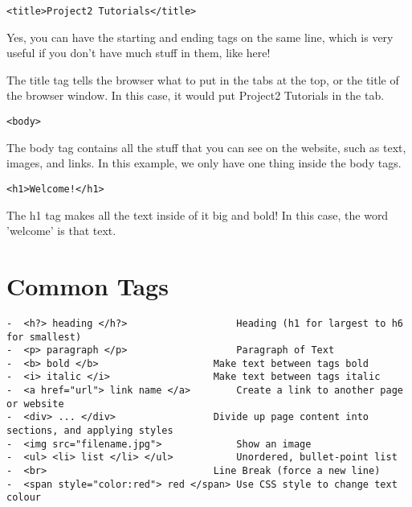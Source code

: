 \documentclass[11pt]{article}
\begin{document}
\begin{verbatim}
<title>Project2 Tutorials</title>
\end{verbatim}

Yes, you can have the starting and ending tags on the same line, which is very useful if you don't have much stuff in them, like here!

The title tag tells the browser what to put in the tabs at the top, or the title of the browser window. In this case, it would put Project2 Tutorials in the tab.

\begin{verbatim}
<body>
\end{verbatim}

The body 
tag contains all the stuff that you can see on the website, such as text, images, and links. In this example, we only have one thing inside the body tags.

\begin{verbatim}
<h1>Welcome!</h1>
\end{verbatim}

The h1 tag makes all the text inside of it big and bold! In this case, the word 'welcome' is that text.

\section*{Common Tags}
\label{sec:orge685565}
\begin{verbatim}
-  <h?> heading </h?>	                Heading (h1 for largest to h6 for smallest)
-  <p> paragraph </p>	                Paragraph of Text
-  <b> bold </b>	                Make text between tags bold
-  <i> italic </i>	                Make text between tags italic
-  <a href="url"> link name </a>        Create a link to another page or website
-  <div> ... </div>	                Divide up page content into sections, and applying styles
-  <img src="filename.jpg"> 	        Show an image
-  <ul> <li> list </li> </ul>	        Unordered, bullet-point list
-  <br> 	                        Line Break (force a new line)
-  <span style="color:red"> red </span> Use CSS style to change text colour
\end{verbatim}
\end{document}
